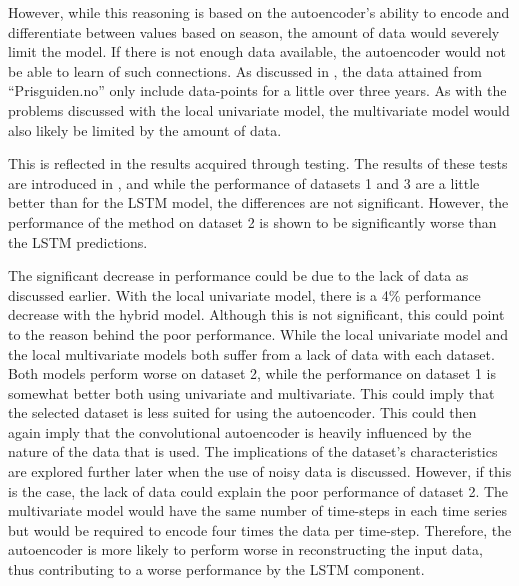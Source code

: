 However, while this reasoning is based on the autoencoder's ability to encode and differentiate between values based on season,
the amount of data would severely limit the model.
If there is not enough data available, the autoencoder would not be able to learn of such connections.
As discussed in , the data attained from ``Prisguiden.no'' only include data-points
for a little over three years.
As with the problems discussed with the local univariate model, the multivariate model would also likely be limited by the amount of data.

This is reflected in the results acquired through testing.
The results of these tests are introduced in ,
and while the performance of datasets 1 and 3 are a little better than for the LSTM model,
the differences are not significant.
However, the performance of the method on dataset 2 is shown to be significantly worse than the LSTM predictions.


The significant decrease in performance could be due to the lack of data as discussed earlier.
With the local univariate model, there is a 4\% performance decrease with the hybrid model.
Although this is not significant, this could point to the reason behind the poor performance.
While the local univariate model and the local multivariate models both suffer from a lack of data with each dataset.
Both models perform worse on dataset 2, while the performance on dataset 1 is somewhat better both using univariate and multivariate.
This could imply that the selected dataset is less suited for using the autoencoder.
This could then again imply that the convolutional autoencoder is heavily influenced by the nature of the data that is used.
The implications of the dataset's characteristics are explored further later when the use of noisy data is discussed.
However, if this is the case, the lack of data could explain the poor performance of dataset 2.
The multivariate model would have the same number of time-steps in each time series but would be required to encode four times the data per time-step.
Therefore, the autoencoder is more likely to perform worse in reconstructing the input data,
thus contributing to a worse performance by the LSTM component.



